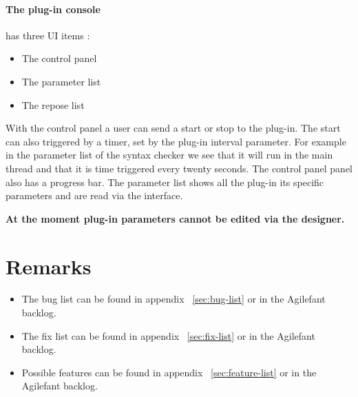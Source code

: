 \paragraph{The plug-in console}has three UI items :
\begin{itemize}
\item The control panel
\item The parameter list
\item The repose list
\end{itemize}

With the control panel a user can send a start or stop to the plug-in. The start
can also triggered by a timer, set by the plug-in interval parameter. For
example in the parameter list of the syntax checker we see that it will run in
the main thread and that it is time triggered every twenty seconds. The control
panel panel also has a progress bar. The parameter list shows all the plug-in
its specific parameters and are read via the interface.

\begin{tcolorbox}[colback=white]
\textbf{
At the moment plug-in parameters cannot be edited via the designer.
}
\end{tcolorbox}


\section{Remarks}
\begin{itemize}
\item The bug list can be found in appendix ~\ref{sec:bug-list} or in the Agilefant backlog.
\item The fix list can be found in appendix ~\ref{sec:fix-list} or in the Agilefant backlog.
\item Possible features can be found in appendix ~\ref{sec:feature-list} or in the Agilefant backlog.
\end{itemize}

